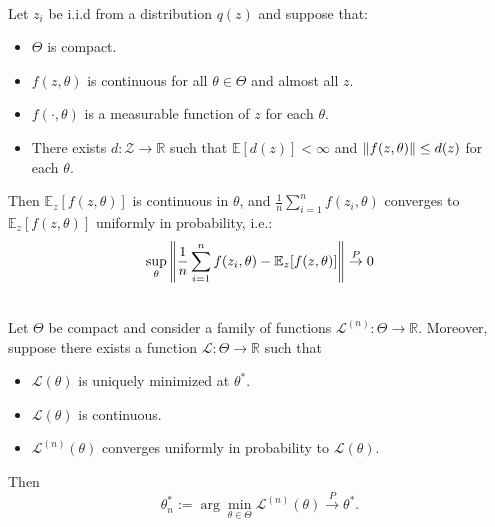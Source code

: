 \begin{lemma} \cite[Lemma 2.4]{whitney1994estimation} \\
    \label{lemma:ULLN}
    Let $z_i$ be i.i.d from a distribution $q(z)$ and suppose that:
    \begin{itemize}
        \item $\Theta$ is compact.
        \item $f(z,\theta)$ is continuous for all $\theta \in \Theta$ and almost all $z$.
        \item $f(\cdot, \theta)$ is a measurable function of $z$ for each $\theta$.
        \item There exists $d: \mathcal{Z} \xrightarrow{} \mathbb{R}$ such that $\mathbb{E}[d(z)]<\infty$ and $\left\lVert f(z,\theta) \right\rVert \leq d(z)$ for each $\theta$.
    \end{itemize}
    Then $\mathbb{E}_{z}[f(z,\theta)]$ is continuous in $\theta$, and $\frac{1}{n}\sum_{i=1}^n f(z_i, \theta)$ converges to $\mathbb{E}_{z}[f(z,\theta)]$ uniformly in probability, i.e.:
    \begin{gather*}
        \sup_\theta \left\lVert \frac{1}{n}\sum_{i=1}^n f(z_i, \theta) - \mathbb{E}_{z}[f(z,\theta)] \right\rVert \overset{P}{\to} 0
    \end{gather*}

\end{lemma}

\begin{lemma} \cite[Theorem 2.1]{whitney1994estimation} \\
    \label{lemma:consistency}
    Let $\Theta$ be compact and consider a family of functions $\mathcal{L}^{(n)}: \Theta \to \mathbb{R}$. Moreover, suppose there exists a function $\mathcal{L}: \Theta \to \mathbb{R}$ such that
    \begin{itemize}
        \item $\mathcal{L}(\theta)$ is uniquely minimized at $\theta^\ast$.
        \item $\mathcal{L}(\theta)$ is continuous.
        \item $\mathcal{L}^{(n)}(\theta)$ converges uniformly in probability to $\mathcal{L}(\theta)$.
    \end{itemize}
    Then $$\theta^\ast_n := \arg\min_{\theta \in \Theta} \mathcal{L}^{(n)}(\theta) \overset{P}{\to} \theta^\ast.$$
\end{lemma}

